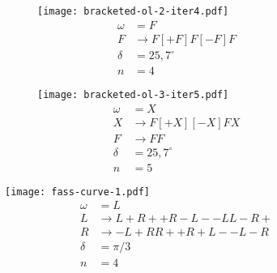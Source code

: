 \begin{figure}[H]
    \centering
    \begin{subfigure}{0.45\textwidth}
        \centering
        \texttt{[image: bracketed-ol-2-iter4.pdf]}
        \begin{align*}
            \omega&=F\\
            F&\to F[+F]F[-F]F\\
            \delta&=25{,}7^\circ\\
            n&=4
        \end{align*}
    \end{subfigure}
    \qquad
    \begin{subfigure}{0.45\textwidth}
        \centering
        \texttt{[image: bracketed-ol-3-iter5.pdf]}
        \begin{align*}
            \omega&=X\\
            X&\to F[+X][-X]FX\\
            F&\to FF\\
            \delta&=25{,}7^\circ\\
            n&=5
        \end{align*}
    \end{subfigure}
\end{figure}
\begin{figure}[H]
    \centering
    \texttt{[image: fass-curve-1.pdf]}
    \begin{align*}
        \omega&=L\\
        L&\to L+R++R-L--LL-R+\\
        R&\to -L+RR++R+L--L-R\\
        \delta&=\pi/3\\
        n&=4
    \end{align*}
\end{figure}